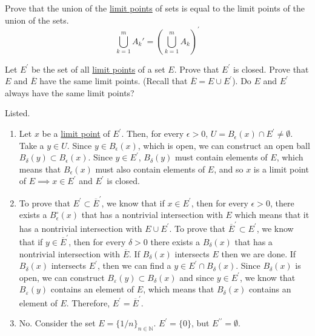   \begin{exercise}
    Prove that the union of the \hyperref[pst-def:limit-point]{limit points} of sets is equal to the limit points of the union of the sets. 
    \begin{equation}
      \bigcup_{k=1}^m A_k'=\left(\bigcup_{k=1}^m A_k\right)^{\!\prime}
    \end{equation}
  \end{exercise}
  \begin{solution}
    
  \end{solution}

  \begin{exercise}[Rudin 2.6]
    Let $E^\prime$ be the set of all \hyperref[pst-def:limit-point]{limit points} of a set $E$. Prove that $E^\prime$ is closed. Prove that $E$ and $\overline{E}$ have the same limit points. (Recall that $\overline{E} = E \cup E^\prime$). Do $E$ and $E^\prime$ always have the same limit points? 
  \end{exercise}
  \begin{solution}
    Listed. 
    \begin{enumerate}
        \item Let $x$ be a \hyperref[pst-def:limit-point]{limit point} of $E^\prime$. Then, for every $\epsilon > 0$, $U = B_\epsilon (x) \cap E^\prime \neq \emptyset$. Take a $y \in U$. Since $y \in B_\epsilon (x)$, which is open, we can construct an open ball $B_\delta (y) \subset B_\epsilon (x)$. Since $y \in E^\prime$, $B_\delta (y)$ must contain elements of $E$, which means that $B_\epsilon (x)$ must also contain elements of $E$, and so $x$ is a limit point of $E \implies x \in E^\prime$ and $E^\prime$ is closed. 

        \item To prove that $E^\prime \subset \overline{E}^\prime$, we know that if $x \in E^\prime$, then for every $\epsilon > 0$, there exists a $B_\epsilon ^\circ (x)$ that has a nontrivial intersection with $E$ which means that it has a nontrivial intersection with $E \cup E^\prime$. To prove that $\overline{E}^\prime \subset E^\prime$, we know that if $y \in \overline{E}^\prime$, then for every $\delta > 0$ there exists a $B_\delta (x)$ that has a nontrivial intersection with $\overline{E}$. If $B_\delta (x)$ intersects $E$ then we are done. If $B_\delta (x)$ intersects $E^\prime$, then we can find a $y \in E^\prime \cap B_\delta (x)$. Since $B_\delta (x)$ is open, we can construct $B_\varepsilon (y) \subset B_\delta (x)$ and since $y \in E^\prime$, we know that $B_\varepsilon (y)$ contains an element of $E$, which means that $B_\delta (x)$ contains an element of $E$. Therefore, $E^\prime = \overline{E}^\prime$. 

        \item No. Consider the set $E = \{1/n\}_{n \in \mathbb{N}}$. $E^\prime = \{0\}$, but $E^{\prime\prime} = \emptyset$. 
    \end{enumerate}
  \end{solution}

